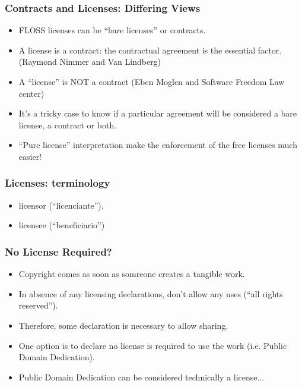 
\begin{frame}
\frametitle{Contracts and Licenses: Differing Views}

\begin{itemize}
\item FLOSS licenses can be ``bare licenses'' or contracts.
\item A license is a contract: the contractual agreement is the essential factor. (Raymond Nimmer and Van Lindberg) 
\item A ``license'' is NOT a contract (Eben Moglen and Software Freedom Law center)
\item It's a tricky case to know if a particular agreement will be considered a bare license, a contract  or both.
\item ``Pure license'' interpretation make the enforcement of the free licenses much easier!
\end{itemize}

\end{frame}


\begin{frame}
\frametitle{Licenses: terminology}

\begin{itemize}
\item licensor (``licenciante'').
\item licensee (``beneficiario'')
\end{itemize}

\end{frame}



\begin{frame}
\frametitle{No License Required?}

\begin{itemize}
\item Copyright comes as soon as somreone creates a tangible work.
\item In absence of any licensing declarations, don't allow any uses (``all rights reserved'').
\item Therefore, some declaration is necessary to allow sharing.
\item One option is to declare no license is required to use the work (i.e. Public Domain Dedication). 
\item Public Domain Dedication can be considered technically a license...
\end{itemize}

\end{frame}

